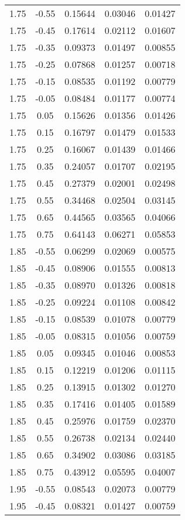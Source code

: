 \begin{longtable}{ccccc}
1.75 & -0.55 & 0.15644 & 0.03046 & 0.01427 \\ 
1.75 & -0.45 & 0.17614 & 0.02112 & 0.01607 \\ 
1.75 & -0.35 & 0.09373 & 0.01497 & 0.00855 \\ 
1.75 & -0.25 & 0.07868 & 0.01257 & 0.00718 \\ 
1.75 & -0.15 & 0.08535 & 0.01192 & 0.00779 \\ 
1.75 & -0.05 & 0.08484 & 0.01177 & 0.00774 \\ 
1.75 & 0.05 & 0.15626 & 0.01356 & 0.01426 \\ 
1.75 & 0.15 & 0.16797 & 0.01479 & 0.01533 \\ 
1.75 & 0.25 & 0.16067 & 0.01439 & 0.01466 \\ 
1.75 & 0.35 & 0.24057 & 0.01707 & 0.02195 \\ 
1.75 & 0.45 & 0.27379 & 0.02001 & 0.02498 \\ 
1.75 & 0.55 & 0.34468 & 0.02504 & 0.03145 \\ 
1.75 & 0.65 & 0.44565 & 0.03565 & 0.04066 \\ 
1.75 & 0.75 & 0.64143 & 0.06271 & 0.05853 \\ \hline
1.85 & -0.55 & 0.06299 & 0.02069 & 0.00575 \\ 
1.85 & -0.45 & 0.08906 & 0.01555 & 0.00813 \\ 
1.85 & -0.35 & 0.08970 & 0.01326 & 0.00818 \\ 
1.85 & -0.25 & 0.09224 & 0.01108 & 0.00842 \\ 
1.85 & -0.15 & 0.08539 & 0.01078 & 0.00779 \\ 
1.85 & -0.05 & 0.08315 & 0.01056 & 0.00759 \\ 
1.85 & 0.05 & 0.09345 & 0.01046 & 0.00853 \\ 
1.85 & 0.15 & 0.12219 & 0.01206 & 0.01115 \\ 
1.85 & 0.25 & 0.13915 & 0.01302 & 0.01270 \\ 
1.85 & 0.35 & 0.17416 & 0.01405 & 0.01589 \\ 
1.85 & 0.45 & 0.25976 & 0.01759 & 0.02370 \\ 
1.85 & 0.55 & 0.26738 & 0.02134 & 0.02440 \\ 
1.85 & 0.65 & 0.34902 & 0.03086 & 0.03185 \\ 
1.85 & 0.75 & 0.43912 & 0.05595 & 0.04007 \\ \hline
1.95 & -0.55 & 0.08543 & 0.02073 & 0.00779 \\ 
1.95 & -0.45 & 0.08321 & 0.01427 & 0.00759 \\ 

\end{longtable}
